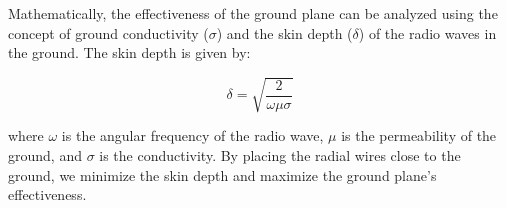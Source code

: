 Mathematically, the effectiveness of the ground plane can be analyzed using the concept of ground conductivity (\(\sigma\)) and the skin depth (\(\delta\)) of the radio waves in the ground. The skin depth is given by:

\[
\delta = \sqrt{\frac{2}{\omega \mu \sigma}}
\]

where \(\omega\) is the angular frequency of the radio wave, \(\mu\) is the permeability of the ground, and \(\sigma\) is the conductivity. By placing the radial wires close to the ground, we minimize the skin depth and maximize the ground plane's effectiveness.

